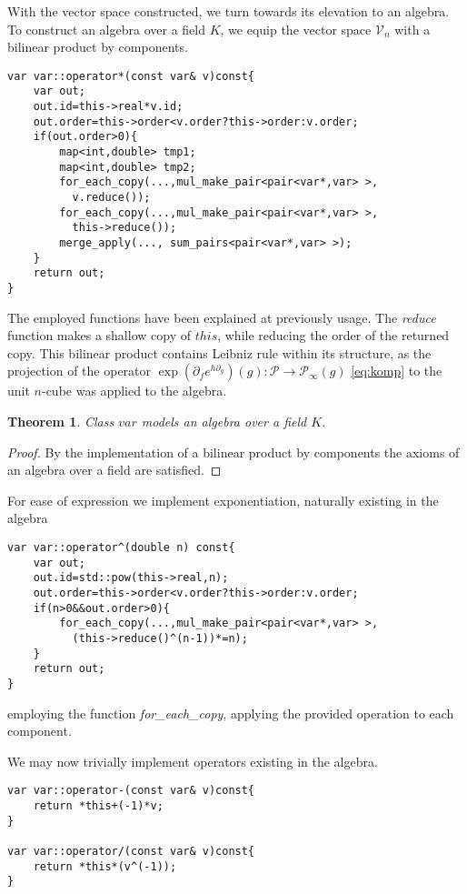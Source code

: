 \documentclass{article}
\newcommand{\VV}{\mathcal{V}}
\newcommand{\dP}{\mathcal{P}}
\newcommand{\D}{\partial}
\newtheorem{izrek}{Theorem}[section]
\begin{document}
With the vector space constructed, we turn towards its elevation to an algebra. To construct an algebra over a field $K$, we equip the vector space $\VV_n$ with a bilinear product by components.

\begin{lstlisting}
var var::operator*(const var& v)const{
    var out;
    out.id=this->real*v.id;
    out.order=this->order<v.order?this->order:v.order;
    if(out.order>0){
        map<int,double> tmp1;
        map<int,double> tmp2;
        for_each_copy(...,mul_make_pair<pair<var*,var> >, 
          v.reduce());
        for_each_copy(...,mul_make_pair<pair<var*,var> >, 
          this->reduce());
        merge_apply(..., sum_pairs<pair<var*,var> >);
    }
    return out;
}
\end{lstlisting}
The employed functions have been explained at previously usage. The \emph{reduce} function makes a shallow copy of $this$, while reducing the order of the returned copy. This bilinear product contains Leibniz rule within its structure, as the projection of the operator $\exp(\D_fe^{h\D_g})(g): \dP\to\dP_\infty(g)$ \eqref{eq:komp} to the unit $n$-cube was applied to the algebra.

\begin{izrek}
Class $var$ models an algebra over a field $K$.
\end{izrek}
\begin{proof}
By the implementation of a bilinear product by components the axioms of an algebra over a field are satisfied.
\end{proof}

For ease of expression we implement exponentiation, naturally existing in the algebra

\begin{lstlisting}
var var::operator^(double n) const{
    var out;
    out.id=std::pow(this->real,n);
    out.order=this->order<v.order?this->order:v.order;
    if(n>0&&out.order>0){
        for_each_copy(...,mul_make_pair<pair<var*,var> >, 
          (this->reduce()^(n-1))*=n);
    }
    return out;
}
\end{lstlisting}
employing the function \emph{for\_each\_copy}, applying the provided operation to each component.

We may now trivially implement operators existing in the algebra.

\begin{lstlisting}
var var::operator-(const var& v)const{
    return *this+(-1)*v;
}

var var::operator/(const var& v)const{
    return *this*(v^(-1));
}
\end{lstlisting}
\end{document}

